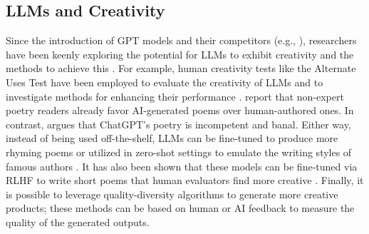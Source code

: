\subsection{LLMs and Creativity}

Since the introduction of GPT models \cite{brown2020language,openai2023gpt4} and their competitors (e.g., \citealp{touvron2023llama}), researchers have been keenly exploring the potential for LLMs to exhibit creativity and the methods to achieve this \cite{franceschelli2023creativity}. For example, human creativity tests like the Alternate Uses Test have been employed to evaluate the creativity of LLMs \cite{stevenson2022putting} and to investigate methods for enhancing their performance \cite{goes2023pushing,summers2023brainstorm}.
\citet{porter2024aigenerated} report that non-expert poetry readers already favor AI-generated poems over human-authored ones. In contrast, \citet{davis2024chatpgt} argues that ChatGPT's poetry is incompetent and banal. Either way, instead of being used off-the-shelf, LLMs can be fine-tuned to produce more rhyming poems \cite{popescu2023gpoet} or utilized in zero-shot settings to emulate the writing styles of famous authors \cite{sawicki2023bits}. 
It has also been shown that these models can be fine-tuned via RLHF \cite{christiano2017deep} to write short poems that human evaluators find more creative \cite{pardinas2023leveraging}. 
Finally, it is possible to leverage quality-diversity algorithms to generate more creative products; these methods can be based on human \cite{li2023quality} or AI \cite{bradley2024quality} feedback to measure the quality of the generated outputs.
